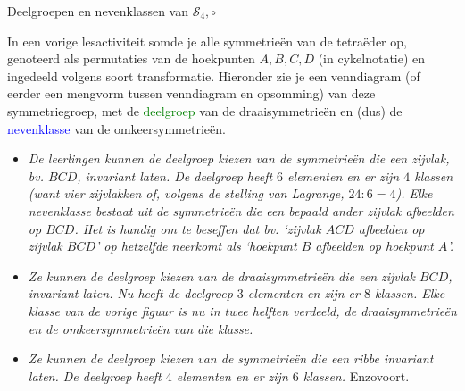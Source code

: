 \begin{lesactiviteit} {Deelgroepen en nevenklassen van $\mathscr{S}_4, \circ$}

In een vorige lesactiviteit somde je alle symmetrieën van de tetraëder op, genoteerd als permutaties van de hoekpunten $A, B, C, D$ (in cykelnotatie) en ingedeeld volgens soort transformatie. Hieronder zie je een venndiagram (of eerder een mengvorm tussen venndiagram en opsomming) van deze symmetriegroep, met de \textcolor{green}{deelgroep} van de draaisymmetrieën en (dus) de \textcolor{blue}{nevenklasse} van de omkeersymmetrieën.


\begin{vraagenantwoord}



\begin{itemize}

    \item \emph{De leerlingen kunnen de deelgroep kiezen van de symmetrieën die een zijvlak, bv. $BCD$, invariant laten. De deelgroep heeft $6$ elementen en er zijn $4$ klassen (want vier zijvlakken of, volgens de stelling van Lagrange, $24:6=4$). Elke nevenklasse bestaat uit de symmetrieën die een bepaald ander zijvlak afbeelden op $BCD$. Het is handig om te beseffen dat bv. `zijvlak $ACD$ afbeelden op zijvlak $BCD$' op hetzelfde neerkomt als `hoekpunt $B$ afbeelden op hoekpunt $A$'. }
    
    \begin{center}
    \end{center}  
    
    \item\emph{Ze kunnen de deelgroep kiezen van de draaisymmetrieën die een zijvlak $BCD$, invariant laten. Nu heeft de deelgroep $3$ elementen en zijn er $8$ klassen. Elke klasse van de vorige figuur is nu in twee helften verdeeld, de draaisymmetrieën en de omkeersymmetrieën van die klasse.}
    
    \begin{center}
    \end{center} 
    
    \item\emph{Ze kunnen de deelgroep kiezen van de symmetrieën die een ribbe invariant laten. De deelgroep heeft $4$ elementen en er zijn $6$ klassen.}
     Enzovoort.
    

\end{itemize}
\end{vraagenantwoord}
\end{lesactiviteit}
